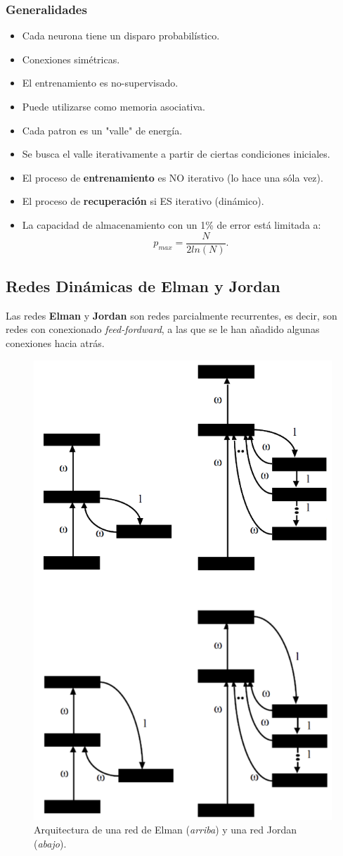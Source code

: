\documentclass[10pt,a4paper]{article}
\begin{document}
\subsubsection{Generalidades}
\begin{multicols}{2}
\begin{itemize}
\item Cada neurona tiene un disparo probabilístico.
\item Conexiones simétricas.
\item El entrenamiento es no-supervisado.
\item Puede utilizarse como memoria asociativa.
\item Cada patron es un "valle" de energía.
\item Se busca el valle iterativamente a partir de ciertas condiciones iniciales.
\item El proceso de \textbf{entrenamiento} es NO iterativo (lo hace una sóla vez).
\item El proceso de \textbf{recuperación} si ES iterativo (dinámico).
\item La capacidad de almacenamiento con un 1\% de error está limitada a: 
\[p_{max} = \frac{N}{2 ln(N)}.\]
\end{itemize}
\end{multicols}

\subsection{Redes Dinámicas de Elman y Jordan}

Las redes \textbf{Elman} y \textbf{Jordan} son redes parcialmente recurrentes, es decir, son redes con conexionado \textit{feed-fordward}, a las que se le han añadido algunas conexiones hacia atrás.

\begin{figure}
  \label{fig:elman_jordan}
  \caption{Arquitectura de una red de Elman (\textit{arriba}) y una red Jordan (\textit{abajo}).}
  \centering
  \hbox{\includegraphics[width=0.45\textwidth-\fboxrule-\fboxrule]{elman_jordan.png}}  
\end{figure}	
\end{document}
